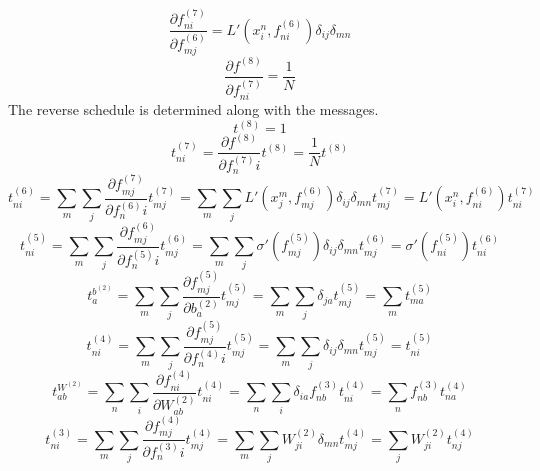 \documentclass[fleqn]{report}
\begin{document}
\begin{equation}
    \frac{\partial f^{(7)}_{ni}}{\partial f^{(6)}_{mj}} = L'\left(x^n_i, f^{(6)}_{ni}\right) \delta_{ij} \delta_{mn}
\end{equation}
\begin{equation}
    \frac{\partial f^{(8)}}{\partial f^{(7)}_{ni}} = \frac{1}{N}
\end{equation}
The reverse schedule is determined along with the messages.
\begin{equation}
    t^{(8)} = 1
\end{equation}
\begin{equation}
    t^{(7)}_{ni} = \frac{\partial f^{(8)}}{\partial f^{(7)}_ni} t^{(8)} = \frac{1}{N} t^{(8)}
\end{equation}
\begin{equation}
    t^{(6)}_{ni} = \sum_m \sum_j \frac{\partial f^{(7)}_{mj}}{\partial f^{(6)}_ni} t^{(7)}_{mj} = \sum_m \sum_j L'\left(x^m_j, f^{(6)}_{mj}\right) \delta_{ij} \delta_{mn} t^{(7)}_{mj} = L'\left(x^n_i, f^{(6)}_{ni}\right) t^{(7)}_{ni}
\end{equation}
\begin{equation}
    t^{(5)}_{ni} = \sum_m \sum_j \frac{\partial f^{(6)}_{mj}}{\partial f^{(5)}_ni} t^{(6)}_{mj} = \sum_m \sum_j \sigma'\left(f^{(5)}_{mj}\right) \delta_{ij} \delta_{mn} t^{(6)}_{mj} = \sigma'\left(f^{(5)}_{ni}\right) t^{(6)}_{ni}
\end{equation}
\begin{equation}
    t^{b^{(2)}}_{a} = \sum_m \sum_j \frac{\partial f^{(5)}_{mj}}{\partial b^{(2)}_a} t^{(5)}_{mj} = \sum_m \sum_j \delta_{ja} t^{(5)}_{mj} = \sum_m t^{(5)}_{ma}
\end{equation}
\begin{equation}
    t^{(4)}_{ni} = \sum_m \sum_j \frac{\partial f^{(5)}_{mj}}{\partial f^{(4)}_ni} t^{(5)}_{mj} = \sum_m \sum_j \delta_{ij} \delta_{mn} t^{(5)}_{mj} = t^{(5)}_{ni}
\end{equation}
\begin{equation}
    t^{W^{(2)}}_{ab} = \sum_n \sum_i \frac{\partial f^{(4)}_{ni}}{\partial W^{(2)}_{ab}} t^{(4)}_{ni} = \sum_n \sum_i \delta_{ia} f^{(3)}_{nb} t^{(4)}_{ni} = \sum_n f^{(3)}_{nb} t^{(4)}_{na}
\end{equation}
\begin{equation}
    t^{(3)}_{ni} = \sum_m \sum_j \frac{\partial f^{(4)}_{mj}}{\partial f^{(3)}_ni} t^{(4)}_{mj} = \sum_m \sum_j W^{(2)}_{ji} \delta_{mn} t^{(4)}_{mj} = \sum_j W^{(2)}_{ji} t^{(4)}_{nj}
\end{equation}
\end{document}
